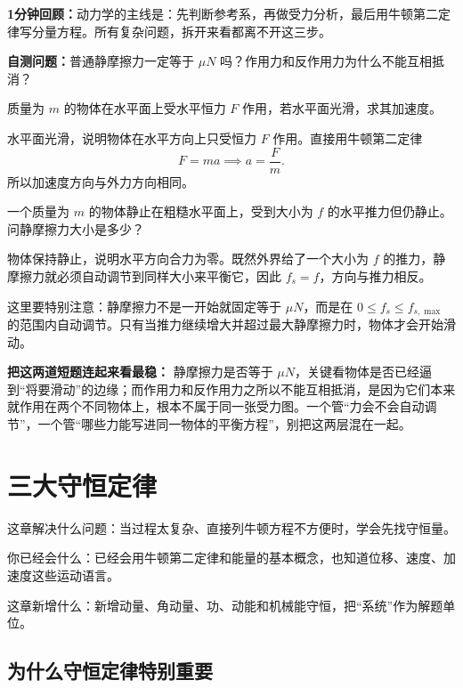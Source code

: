 \documentclass[lang=cn,11pt]{elegantbook}
\newcommand{\chapterroadmap}[3]{%
\begin{introduction}
  \item {\heiti 这章解决什么问题：}#1
  \item {\heiti 你已经会什么：}#2
  \item {\heiti 这章新增什么：}#3
\end{introduction}}
\newcommand{\summaryline}[1]{\par\noindent\textbf{1分钟回顾：}#1\par}
\newcommand{\chapterselfcheck}[1]{\par\noindent\textbf{自测问题：}#1\par}
\begin{document}
\summaryline{动力学的主线是：先判断参考系，再做受力分析，最后用牛顿第二定律写分量方程。所有复杂问题，拆开来看都离不开这三步。}
\chapterselfcheck{普通静摩擦力一定等于 \(\mu N\) 吗？作用力和反作用力为什么不能互相抵消？}

\begin{exercise}[]
质量为 \(m\) 的物体在水平面上受水平恒力 \(F\) 作用，若水平面光滑，求其加速度。
\end{exercise}

\begin{solution}
水平面光滑，说明物体在水平方向上只受恒力 \(F\) 作用。直接用牛顿第二定律
\[
F=ma \implies
a=\frac{F}{m}.
\]
所以加速度方向与外力方向相同。
\end{solution}

\begin{exercise}[]
一个质量为 \(m\) 的物体静止在粗糙水平面上，受到大小为 \(f\) 的水平推力但仍静止。问静摩擦力大小是多少？
\end{exercise}

\begin{solution}
物体保持静止，说明水平方向合力为零。既然外界给了一个大小为 \(f\) 的推力，静摩擦力就必须自动调节到同样大小来平衡它，因此 \(f_s=f\)，方向与推力相反。

这里要特别注意：静摩擦力不是一开始就固定等于 \(\mu N\)，而是在 \(0\le f_s\le f_{s,\max}\) 的范围内自动调节。只有当推力继续增大并超过最大静摩擦力时，物体才会开始滑动。
\end{solution}

\begin{note}
\textbf{把这两道短题连起来看最稳：} 静摩擦力是否等于 \(\mu N\)，关键看物体是否已经逼到“将要滑动”的边缘；而作用力和反作用力之所以不能互相抵消，是因为它们本来就作用在两个不同物体上，根本不属于同一张受力图。一个管“力会不会自动调节”，一个管“哪些力能写进同一物体的平衡方程”，别把这两层混在一起。
\end{note}

\chapter{三大守恒定律}

\chapterroadmap
{当过程太复杂、直接列牛顿方程不方便时，学会先找守恒量。}
{已经会用牛顿第二定律和能量的基本概念，也知道位移、速度、加速度这些运动语言。}
{新增动量、角动量、功、动能和机械能守恒，把“系统”作为解题单位。}

\section{为什么守恒定律特别重要}
\end{document}

